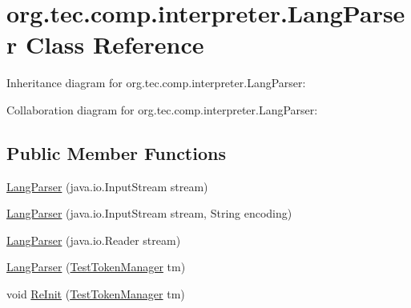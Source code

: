 \hypertarget{classorg_1_1tec_1_1comp_1_1interpreter_1_1_lang_parser}{}\section{org.\+tec.\+comp.\+interpreter.\+Lang\+Parser Class Reference}
\label{classorg_1_1tec_1_1comp_1_1interpreter_1_1_lang_parser}


Inheritance diagram for org.\+tec.\+comp.\+interpreter.\+Lang\+Parser\+:


Collaboration diagram for org.\+tec.\+comp.\+interpreter.\+Lang\+Parser\+:
\subsection*{Public Member Functions}
\begin{DoxyCompactItemize}
\item 
\mbox{\hyperlink{classorg_1_1tec_1_1comp_1_1interpreter_1_1_lang_parser_a0311cd79c40b029fd1a6d6373de0b117}{Lang\+Parser}} (java.\+io.\+Input\+Stream stream)
\item 
\mbox{\hyperlink{classorg_1_1tec_1_1comp_1_1interpreter_1_1_lang_parser_abe823e9a3d882b36b8e5078c6d3699af}{Lang\+Parser}} (java.\+io.\+Input\+Stream stream, String encoding)
\item 
\mbox{\hyperlink{classorg_1_1tec_1_1comp_1_1interpreter_1_1_lang_parser_ac8c86581638dfac7105757dc41424b5f}{Lang\+Parser}} (java.\+io.\+Reader stream)
\item 
\mbox{\hyperlink{classorg_1_1tec_1_1comp_1_1interpreter_1_1_lang_parser_ab75e6cce61a1e759677e2c3895af1b0c}{Lang\+Parser}} (\mbox{\hyperlink{classorg_1_1tec_1_1comp_1_1interpreter_1_1_test_token_manager}{Test\+Token\+Manager}} tm)
\item 
void \mbox{\hyperlink{classorg_1_1tec_1_1comp_1_1interpreter_1_1_lang_parser_a97581347b710d7b6ca031b909638cee1}{Re\+Init}} (\mbox{\hyperlink{classorg_1_1tec_1_1comp_1_1interpreter_1_1_test_token_manager}{Test\+Token\+Manager}} tm)
\end{DoxyCompactItemize}
